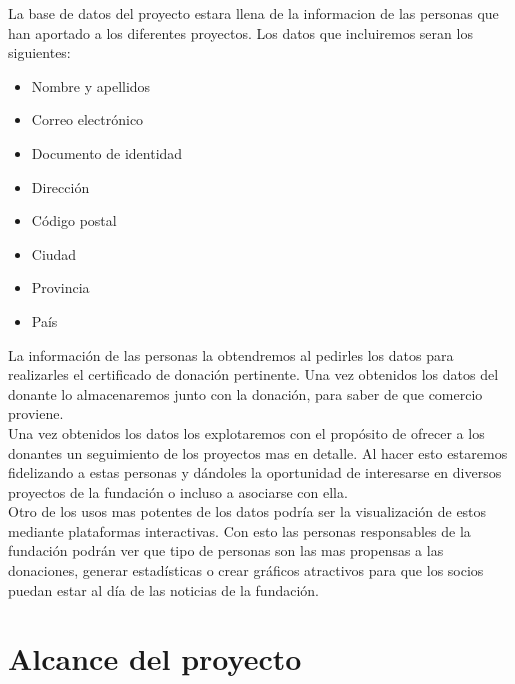 \documentclass[paper=a4, fontsize=11pt]{scrartcl} %
\numberwithin{equation}{section} %
\numberwithin{figure}{section} %
\numberwithin{table}{section} %
\begin{document}
La base de datos del proyecto estara llena de la informacion de las personas que han aportado a los diferentes proyectos. Los datos que incluiremos seran los siguientes:

\begin{itemize}
	\item Nombre y apellidos
	\item Correo electrónico
	\item Documento de identidad
	\item Dirección 
	\item Código postal
	\item Ciudad
	\item Provincia
	\item País
\end{itemize}

La información de las personas la obtendremos al pedirles los datos para realizarles el certificado de donación pertinente. Una vez obtenidos los datos del donante lo almacenaremos junto con la donación, para saber de que comercio proviene.\\

Una vez obtenidos los datos los explotaremos con el propósito de ofrecer a los donantes un seguimiento de los proyectos mas en detalle. Al hacer esto estaremos fidelizando a estas personas y dándoles la oportunidad de interesarse en diversos proyectos de la fundación o incluso a asociarse con ella.\\

Otro de los usos mas potentes de los datos podría ser la visualización de estos mediante plataformas interactivas. Con esto las personas responsables de la fundación podrán ver que tipo de personas son las mas propensas a las donaciones, generar estadísticas o crear gráficos atractivos para que los socios puedan estar al día de las noticias de la fundación.


\section{Alcance del proyecto}

\end{document}
